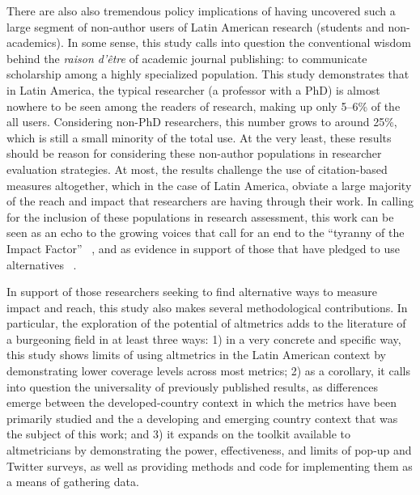 There are also also tremendous policy implications of having uncovered such a large segment of non-author users of Latin American research (students and non-academics). In some sense, this study calls into question the conventional wisdom behind the \emph{raison d'être} of academic journal publishing: to communicate scholarship among a highly specialized population. This study demonstrates that in Latin America, the typical researcher (a professor with a PhD) is almost nowhere to be seen among the readers of research, making up only 5--6\% of the all users. Considering non-PhD researchers, this number grows to around 25\%, which is still a small minority of the total use. At the very least, these results should be reason for considering these non-author populations in researcher evaluation strategies. At most, the results challenge the use of citation-based measures altogether, which in the case of Latin America, obviate a large majority of the reach and impact that researchers are having through their work. In calling for the inclusion of these populations in research assessment, this work can be seen as an echo to the growing voices that call for an end to the ``tyranny of the Impact Factor'' ~\citep[p. 479]{Colquhoun2003}, and as evidence in support of those that have pledged to use alternatives ~\citep{DORA2012}.

In support of those researchers seeking to find alternative ways to measure impact and reach, this study also makes several methodological contributions. In particular, the exploration of the potential of altmetrics adds to the literature of a burgeoning field in at least three ways: 1) in a very concrete and specific way, this study shows limits of using altmetrics in the Latin American context by demonstrating lower coverage levels across most metrics; 2) as a corollary, it calls into question the universality of previously published results, as differences emerge between the developed-country context in which the metrics have been primarily studied and the a developing and emerging country context that was the subject of this work; and 3) it expands on the toolkit available to altmetricians by demonstrating the power, effectiveness, and limits of pop-up and Twitter surveys, as well as providing methods and code for implementing them as a means of gathering data.

